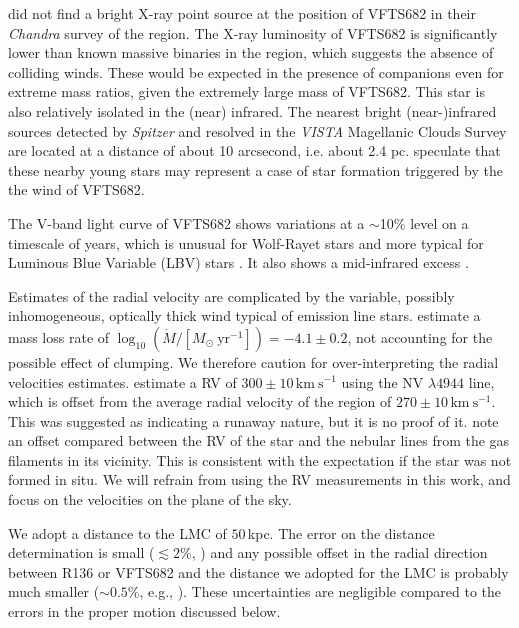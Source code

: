 \documentclass[a4paper,fleqn,usenatbib]{mnras}
\newcommand{\kms}{{\,\mathrm{km\ s^{-1}}}}
\begin{document}
\cite{townsley:06} did not find
a bright X-ray point source at the position of VFTS682 in their
\emph{Chandra} survey of the region. The X-ray luminosity of VFTS682
is significantly lower than known massive binaries in the region, which suggests the absence of
colliding winds. These would be expected in the presence of companions
even for extreme mass ratios, given the extremely large mass of
VFTS682. This star is also relatively isolated in the (near)
infrared. The nearest bright (near-)infrared sources detected by
\emph{Spitzer} \citep{meixner:06} and resolved in the \emph{VISTA}
Magellanic Clouds Survey \citep{cioni:11} are located at a distance of
about 10 arcsecond, i.e. about 2.4 pc. \cite{walborn:13} speculate
that these nearby young stars may represent a case of star formation triggered by the the wind of VFTS682.

The V-band light curve of VFTS682  shows
variations at a $\sim$10\% level on a timescale of years, which is
unusual for Wolf-Rayet stars and more typical for Luminous Blue
Variable (LBV) stars \citep{parker:93, udalski:08, bestenlehner:11}. It also
shows a mid-infrared excess \citep{gruendl:09}.

Estimates of the radial velocity are complicated by the variable,
possibly inhomogeneous, optically thick wind  typical of emission line
stars. \citet{bestenlehner:11} estimate a mass loss rate of
$\log_{10}(\dot{M}/[M_\odot \ \mathrm{yr}^{-1}])=-4.1\pm0.2$, not accounting for the
possible effect of clumping.  We therefore caution
for over-interpreting the radial velocities estimates. %
\citet{bestenlehner:11}  estimate a RV of
$300\pm10\kms$ using the  N{\footnotesize V} $\lambda4944$ line, which
is offset from the average radial velocity of the region of
$270\pm10\kms$. This was suggested as indicating a runaway nature, but
it is no proof of it. %
\cite{bressert:12} note an offset compared between the RV of
the star and the nebular lines from the gas filaments in its
vicinity. This is consistent with the expectation if the star was not
formed in situ. We will refrain from using the RV measurements in this
work, and focus on the velocities on the plane of the sky. 

We adopt a distance to the LMC of $50$\,kpc. The error on
the distance determination is small ($\lesssim2\%$,
\citealt{pietrzynski:13}) and any possible offset in the radial
direction between R136 or VFTS682 and the distance we adopted for the
LMC is probably much smaller ($\sim$$0.5\%$, e.g., \citealt{luks:92}). These uncertainties are negligible compared to the errors in the proper motion discussed below.  
\end{document}

